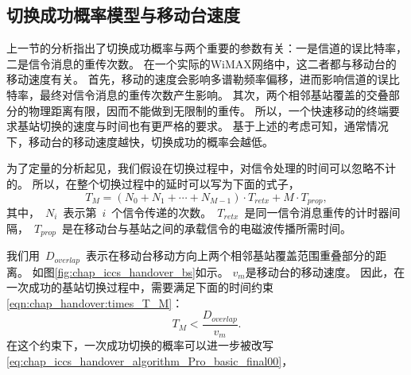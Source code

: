 \subsection{切换成功概率模型与移动台速度}
上一节的分析指出了切换成功概率与两个重要的参数有关：一是信道的误比特率，二是信令消息的重传次数。
在一个实际的WiMAX网络中，这二者都与移动台的移动速度有关。
首先，移动的速度会影响多谱勒频率偏移，进而影响信道的误比特率，最终对信令消息的重传次数产生影响。
其次，两个相邻基站覆盖的交叠部分的物理距离有限，因而不能做到无限制的重传。
所以，一个快速移动的终端要求基站切换的速度与时间也有更严格的要求。
基于上述的考虑可知，通常情况下，移动台的移动速度越快，切换成功的概率会越低。

为了定量的分析起见，我们假设在切换过程中，对信令处理的时间可以忽略不计的。
所以，在整个切换过程中的延时可以写为下面的式子，
$$
T_{M}=(N_{0}+N_{1}+\cdots+N_{M-1})\cdot T_{retx}+M\cdot T_{prop},
$$
其中，~$N_i$~表示第~$i$~个信令传递的次数。~$T_{retx}$~是同一信令消息重传的计时器间隔，~$T_{prop}$~是在移动台与基站之间的承载信令的电磁波传播所需时间。

我们用~$D_{overlap}$~表示在移动台移动方向上两个相邻基站覆盖范围重叠部分的距离。
如图\ref{fig:chap_iccs_handover_bs}如示。
$v_m$是移动台的移动速度。
因此，在一次成功的基站切换过程中，需要满足下面的时间约束\eqref{eqn:chap_handover:times_T_M}：
\begin{equation}
T_{M}<\frac{D_{overlap}}{v_{m}}.
\label{eqn:chap_handover:times_T_M}
\end{equation}
在这个约束下，一次成功切换的概率可以进一步被改写\eqref{eq:chap_iccs_handover_algorithm_Pro_basic_final00}，

